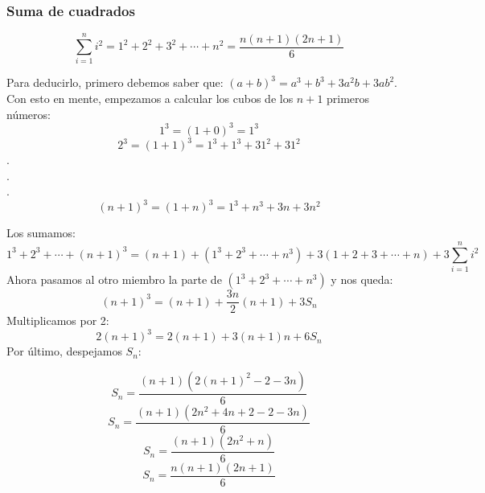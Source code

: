 \documentclass[10pt,a4paper,spanish]{report}
\begin{document}
\subsubsection{\textcolor[rgb]{0.1,0.2,0.6}Suma de cuadrados}
\begin{center}
\begin{displaymath}
\sum_{i=1}^n i^{2} = 1^{2} + 2^{2} + 3^{2} + \cdots + n^{2} = \frac{n(n+1)(2n+1)}{6}
\end{displaymath}

Para deducirlo, primero debemos saber que: $(a+b)^{3} = a^{3} + b^{3} + 3a^{2}b + 3ab^{2}$. Con esto en mente, empezamos a calcular los cubos de los $n+1$ primeros números:
\begin{displaymath}
1^{3} = (1+0)^{3} = 1^{3}
\end{displaymath}
\begin{displaymath}
2^{3} = (1+1)^{3} = 1^{3} + 1^{3} + 3  1^{2} + 3  1^{2}
\end{displaymath}
.\\
.\\
.\\
\begin{displaymath}
(n+1)^{3} = (1+n)^{3} = 1^{3} + n^{3} + 3n + 3n^{2}
\end{displaymath}

Los sumamos:
\begin{displaymath}
1^{3} + 2^{3} + \cdots + (n+1)^{3} = (n+1) + (1^{3} + 2^{3} + \cdots + n^{3}) + 3(1+2+3+ \cdots + n) + 3 \sum_{i=1}^n i^{2}
\end{displaymath}
Ahora pasamos al otro miembro la parte de $(1^{3} + 2^{3} + \cdots + n^{3})$ y nos queda:
\begin{displaymath}
(n+1)^{3} = (n+1) + \frac{3n}{2}(n+1) + 3S_{n}
\end{displaymath}
Multiplicamos por 2:
\begin{displaymath}
2(n+1)^{3} = 2(n+1) + 3(n+1)n + 6S_{n}
\end{displaymath}
Por último, despejamos $S_{n}$:

\begin{displaymath}
S_{n} = \frac{(n+1)(2(n+1)^{2} - 2 - 3n)}{6}
\end{displaymath}
\begin{displaymath}
S_{n} = \frac{(n+1)(2n^{2} + 4n + 2 - 2 - 3n)}{6}
\end{displaymath}
\begin{displaymath}
S_{n} = \frac{(n+1)(2n^{2} + n)}{6}
\end{displaymath}
\begin{displaymath}
S_{n} = \frac{n(n+1)(2n+1)}{6}
\end{displaymath}
\end{center}
\end{document}
